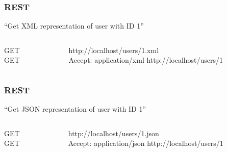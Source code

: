 
\begin{frame}
  \frametitle{REST}
  \begin{center}
  ``Get XML representation of user with ID 1''
  \end{center}
  \begin{columns}
    \begin{column}{.2\textwidth}
      \begin{flushright}
      GET\\
      GET
      \end{flushright}
    \end{column}    
    \begin{column}{.8\textwidth}
      \begin{flushleft}
      http://localhost/users/1\alert{.xml}\\
      \alert{Accept: application/xml} http://localhost/users/1
      \end{flushleft}
    \end{column}    
  \end{columns}
\end{frame}

\begin{frame}
  \frametitle{REST}
  \begin{center}
  ``Get JSON representation of user with ID 1''
  \end{center}
  \begin{columns}
    \begin{column}{.2\textwidth}
      \begin{flushright}
      GET\\
      GET
      \end{flushright}
    \end{column}    
    \begin{column}{.8\textwidth}
      \begin{flushleft}
      http://localhost/users/1\alert{.json}\\
      \alert{Accept: application/json} http://localhost/users/1
      \end{flushleft}
    \end{column}    
  \end{columns}
\end{frame}

